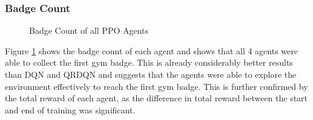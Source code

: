 \subsubsection{Badge Count}
\begin{figure}[H]
    \centering
    \caption{Badge Count of all PPO Agents}
    \label{fig:PPO_badge_count}
\end{figure}

Figure \ref{fig:PPO_badge_count} shows the badge count of each agent and shows that all 4 agents were able to collect the first gym badge. This is already considerably better results than DQN and QRDQN and suggests that the agents were able to explore the environment effectively to reach the first gym badge. This is further confirmed by the total reward of each agent, as the difference in total reward between the start and end of training was significant. 

